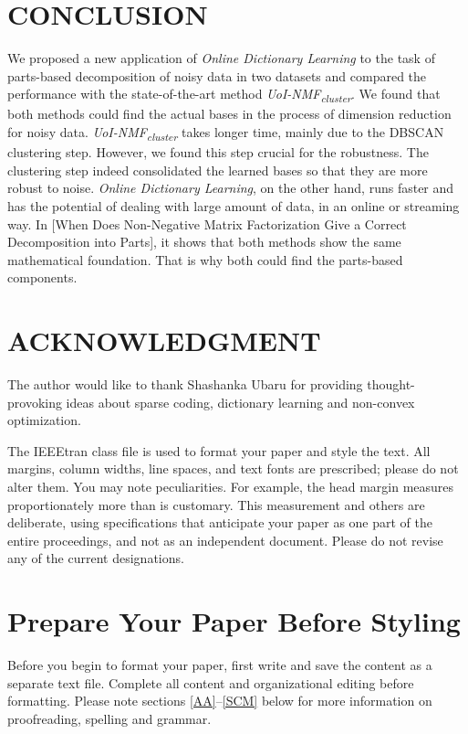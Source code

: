 \documentclass[conference]{IEEEtran}
\begin{document}
\section{CONCLUSION}

We proposed a new application of \textit{Online Dictionary Learning} to the task of parts-based decomposition of noisy data in two datasets and compared the performance with the state-of-the-art method \textit{UoI-NMF\textsubscript{cluster}}. We found that both methods could find the actual bases in the process of dimension reduction for noisy data. \textit{UoI-NMF\textsubscript{cluster}} takes longer time, mainly due to the DBSCAN clustering step. However, we found this step crucial for the robustness. The clustering step indeed consolidated the learned bases so that they are more robust to noise. \textit{Online Dictionary Learning}, on the other hand, runs faster and has the potential of dealing with large amount of data, in an online or streaming way. In [When Does Non-Negative Matrix Factorization
Give a Correct Decomposition into Parts], it shows that both methods show the same mathematical foundation. That is why both could find the parts-based components.

\section{ACKNOWLEDGMENT}

The author would like to thank Shashanka Ubaru for providing thought-provoking ideas about sparse coding, dictionary learning and non-convex optimization.

The IEEEtran class file is used to format your paper and style the text. All margins,
column widths, line spaces, and text fonts are prescribed; please do not
alter them. You may note peculiarities. For example, the head margin
measures proportionately more than is customary. This measurement
and others are deliberate, using specifications that anticipate your paper
as one part of the entire proceedings, and not as an independent document.
Please do not revise any of the current designations.

\section{Prepare Your Paper Before Styling}
Before you begin to format your paper, first write and save the content as a
separate text file. Complete all content and organizational editing before
formatting. Please note sections \ref{AA}--\ref{SCM} below for more information on
proofreading, spelling and grammar.
\end{document}
